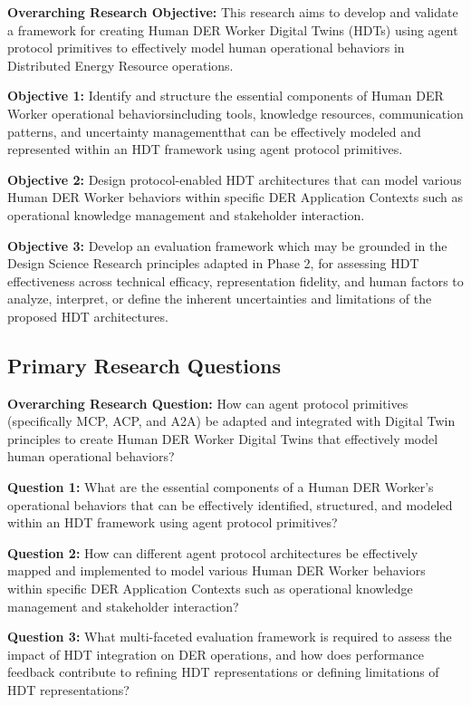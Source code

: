 \documentclass[12pt,a4paper]{article}
\newcommand{\emdash}{\textemdash}
\begin{document}
\textbf{Overarching Research Objective:} This research aims to develop and validate a framework for creating Human DER Worker Digital Twins (HDTs) using agent protocol primitives to effectively model human operational behaviors in Distributed Energy Resource operations.

\textbf{Objective 1:} Identify and structure the essential components of Human DER Worker operational behaviors\emdash including tools, knowledge resources, communication patterns, and uncertainty management\emdash that can be effectively modeled and represented within an HDT framework using agent protocol primitives.

\textbf{Objective 2:} Design protocol-enabled HDT architectures that can model various Human DER Worker behaviors within specific DER Application Contexts such as operational knowledge management and stakeholder interaction.

\textbf{Objective 3:} Develop an evaluation framework which may be grounded in the Design Science Research principles adapted in Phase 2, for assessing HDT effectiveness across technical efficacy, representation fidelity, and human factors to analyze, interpret, or define the inherent uncertainties and limitations of the proposed HDT architectures.

\subsection{Primary Research Questions}

\textbf{Overarching Research Question:} How can agent protocol primitives (specifically MCP, ACP, and A2A) be adapted and integrated with Digital Twin principles to create Human DER Worker Digital Twins that effectively model human operational behaviors?

\textbf{Question 1:} What are the essential components of a Human DER Worker's operational behaviors that can be effectively identified, structured, and modeled within an HDT framework using agent protocol primitives?

\textbf{Question 2:} How can different agent protocol architectures be effectively mapped and implemented to model various Human DER Worker behaviors within specific DER Application Contexts such as operational knowledge management and stakeholder interaction?

\textbf{Question 3:} What multi-faceted evaluation framework is required to assess the impact of HDT integration on DER operations, and how does performance feedback contribute to refining HDT representations or defining limitations of HDT representations?
\end{document}
